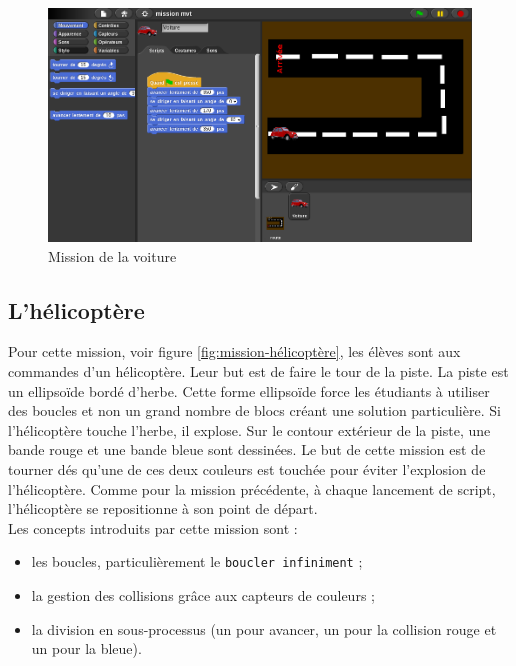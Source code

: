 \begin{figure}
  \begin{center}
    \includegraphics[width=\textwidth]{content/7-solution/1-missions/images/voiture}
    \caption{Mission de la voiture}
    \label{fig:mission-voiture}
  \end{center}
\end{figure}


\subsection{L'hélicoptère}
\label{mission-helicoptere}
Pour cette \gls{mission}, voir figure \ref{fig:mission-hélicoptère}, les élèves sont aux commandes d'un hélicoptère. Leur but est de faire le tour de la piste. La piste est un ellipsoïde bordé d'herbe. Cette forme ellipsoïde force les étudiants à utiliser des boucles et non un grand nombre de \glspl{bloc} créant une solution particulière. Si l'hélicoptère touche l'herbe, il explose. Sur le contour extérieur de la piste, une bande rouge et une bande bleue sont dessinées. Le but de cette \gls{mission} est de tourner dés qu'une de ces deux couleurs est touchée pour éviter l'explosion de l'hélicoptère. Comme pour la \gls{mission} précédente, à chaque lancement de \gls{script}, l'hélicoptère se repositionne à son point de départ.\\

Les concepts introduits par cette \gls{mission} sont :
\begin{itemize}
\item les boucles, particulièrement le \texttt{boucler infiniment} ;
\item la gestion des collisions grâce aux capteurs de couleurs ;
\item la division en sous-processus (un pour avancer, un pour la collision rouge et un pour la bleue).
\end{itemize}

